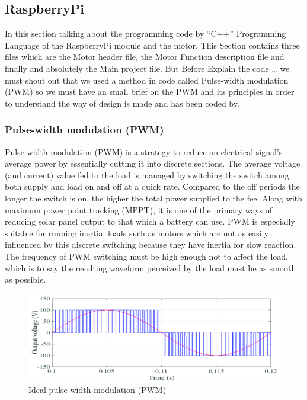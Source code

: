 \subsection{RaspberryPi}

In this section talking about the programming code by “C++” Programming Language of the RaspberryPi module and the motor. This Section contains three files which are the Motor header file, the Motor Function description file and finally and absolutely the Main project file. But Before Explain the code … we must shout out that we used a method in code called Pulse-width modulation (PWM) so we must have an small brief on the PWM and its principles in order to understand the way of design is made and has been coded by.

\subsubsection{Pulse-width modulation (PWM)}

Pulse-width modulation (PWM) is a strategy to reduce an electrical signal's average power by essentially cutting it into discrete sections. The average voltage (and current) value fed to the load is managed by switching the switch among both supply and load on and off at a quick rate. Compared to the off periods the longer the switch is on, the higher the total power supplied to the fee. Along with maximum power point tracking (MPPT), it is one of the primary ways of reducing solar panel output to that which a battery can use. PWM is especially suitable for running inertial loads such as motors which are not as easily influenced by this discrete switching because they have inertia for slow reaction. The frequency of PWM switching must be high enough not to affect the load, which is to say the resulting waveform perceived by the load must be as smooth as possible.

\begin{figure}[h]
    \centering
    \includegraphics[width=.8\textwidth]{figures/50.png}
    \caption{Ideal pulse-width modulation (PWM)}
    \label{fig:my_label}
\end{figure}

